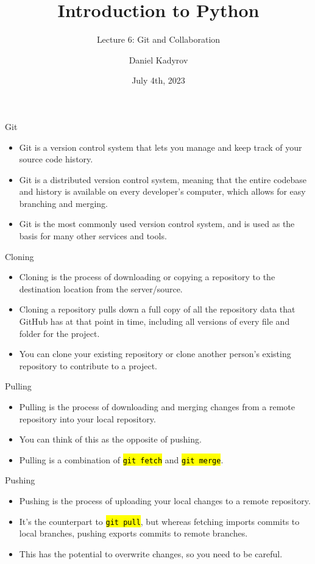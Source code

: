 \documentclass[
    aspectratio=169, 
    usepdftitle=false, 
    xcolor={dvipsnames},
    hyperref={
        colorlinks,
        linkcolor=black,
        urlcolor=blue}
    ]{beamer}
\title[Introduction to Python]{Introduction to Python}
\subtitle{Lecture 6: Git and Collaboration}
\author{Daniel Kadyrov}
\date{July 4th, 2023}
\let\OldTexttt\texttt
\renewcommand{\texttt}[1]{\OldTexttt{\hl{#1}}}%
\begin{document}
\begin{frame}
    \titlepage
\end{frame}

\begin{frame}{Git}
    \begin{itemize}
        \item Git is a version control system that lets you manage and keep track of your source code history.
        \item Git is a distributed version control system, meaning that the entire codebase and history is available on every developer's computer, which allows for easy branching and merging.
        \item Git is the most commonly used version control system, and is used as the basis for many other services and tools.
    \end{itemize}
\end{frame}

\begin{frame}{Cloning}
    \begin{itemize}
        \item Cloning is the process of downloading or copying a repository to the destination location from the server/source.
        \item Cloning a repository pulls down a full copy of all the repository data that GitHub has at that point in time, including all versions of every file and folder for the project.
        \item You can clone your existing repository or clone another person's existing repository to contribute to a project.
    \end{itemize}
\end{frame}

\begin{frame}{Pulling}
    \begin{itemize}
        \item Pulling is the process of downloading and merging changes from a remote repository into your local repository.
        \item You can think of this as the opposite of pushing.
        \item Pulling is a combination of \texttt{git fetch} and \texttt{git merge}.
    \end{itemize}
\end{frame}

\begin{frame}{Pushing}
    \begin{itemize}
        \item Pushing is the process of uploading your local changes to a remote repository.
        \item It's the counterpart to \texttt{git pull}, but whereas fetching imports commits to local branches, pushing exports commits to remote branches.
        \item This has the potential to overwrite changes, so you need to be careful.
    \end{itemize}
\end{frame}
\end{document}
